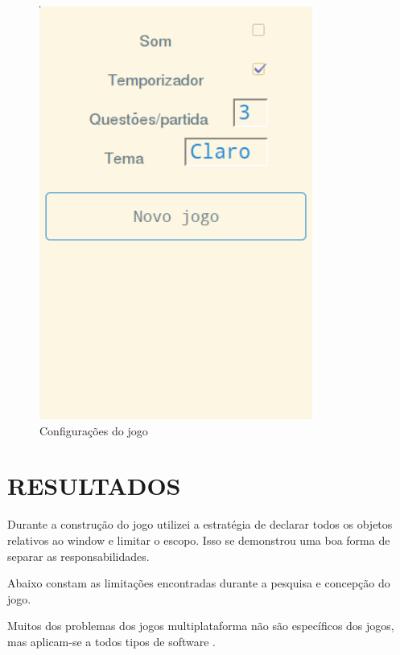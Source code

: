 \documentclass[
12pt,
a4paper,
portuges,
draft
]{report}
\begin{document}
\begin{figure}
    \centering
    \includegraphics[width=0.8\textwidth,natwidth=610,natheight=642]{settings.png}
	\caption{Configurações do jogo}
\end{figure}





\chapter{RESULTADOS}
\thispagestyle{myheadings}

Durante a construção do jogo utilizei a estratégia de declarar todos
os objetos relativos ao window e limitar o escopo. Isso se demonstrou uma boa forma de separar as responsabilidades.

Abaixo constam as limitações encontradas durante a pesquisa e concepção do jogo.

Muitos dos problemas dos jogos multiplataforma não são específicos
dos jogos, mas aplicam-se a todos tipos de software  \parencite{currentStateCrossPlatform}.
\end{document}
